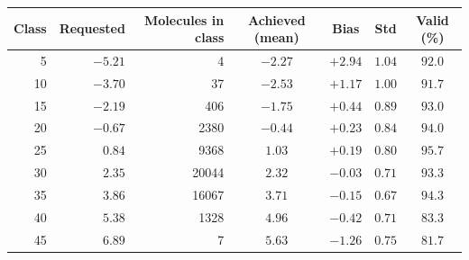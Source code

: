 \documentclass[11pt]{article}
\begin{document}
\begin{center}
\small
\begin{tabular}{@{}rrrcccc@{}}
\toprule
Class & Requested & Molecules in class & Achieved (mean) & Bias & Std & Valid (\%)\\
\midrule
5  & $-5.21$ & 4      & $-2.27$ & $+2.94$ & $1.04$ & $92.0$\\
10 & $-3.70$ & 37     & $-2.53$ & $+1.17$ & $1.00$ & $91.7$\\
15 & $-2.19$ & 406    & $-1.75$ & $+0.44$ & $0.89$ & $93.0$\\
20 & $-0.67$ & 2380   & $-0.44$ & $+0.23$ & $0.84$ & $94.0$\\
25 & $0.84$  & 9368   & $1.03$  & $+0.19$ & $0.80$ & $95.7$\\
30 & $2.35$  & 20044  & $2.32$  & $-0.03$ & $0.71$ & $93.3$\\
35 & $3.86$  & 16067  & $3.71$  & $-0.15$ & $0.67$ & $94.3$\\
40 & $5.38$  & 1328   & $4.96$  & $-0.42$ & $0.71$ & $83.3$\\
45 & $6.89$  & 7      & $5.63$  & $-1.26$ & $0.75$ & $81.7$\\
\bottomrule
\end{tabular}
\end{center}
\end{document}
